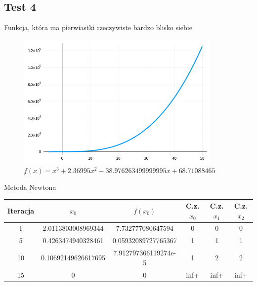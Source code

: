 \documentclass[a4paper]{article}
\begin{document}
\newpage
\subsection{Test 4}
    Funkcja, która ma pierwiastki rzeczywiste bardzo blisko siebie
    \begin{figure}[h]
        \centering
        \includegraphics[width=10cm]{4}
        \caption{$f(x) = x^3 + 2.36995x^2 - 38.976263499999995x + 68.71088465$}
    \end{figure}

    \begin{center}
        Metoda Newtona
    \end{center}
    \begin{center}
        \begin{tabular}{|c|c|c|c|c|c|} 
            \hline
            Iteracja & $x_0$ & $f(x_0)$ & C.z. $x_0$ & C.z. $x_1$ & C.z. $x_2$ \\
            \hline
            1 & 2.0113803008969344 & 7.732777080647594 & 0 & 0 & 0 \\
            \hline
            5 & 0.4263474940328461 & 0.05932089727765367 & 1 & 1 & 1 \\
            \hline
            10 & 0.10692149626617695 & 7.912797366119274e-5 & 1 & 2 & 2 \\
            \hline
            15 & 0 & 0 & inf+ & inf+ & inf+ \\
            \hline
        \end{tabular}
    \end{center}
        
    \vspace{5mm}
\end{document}
